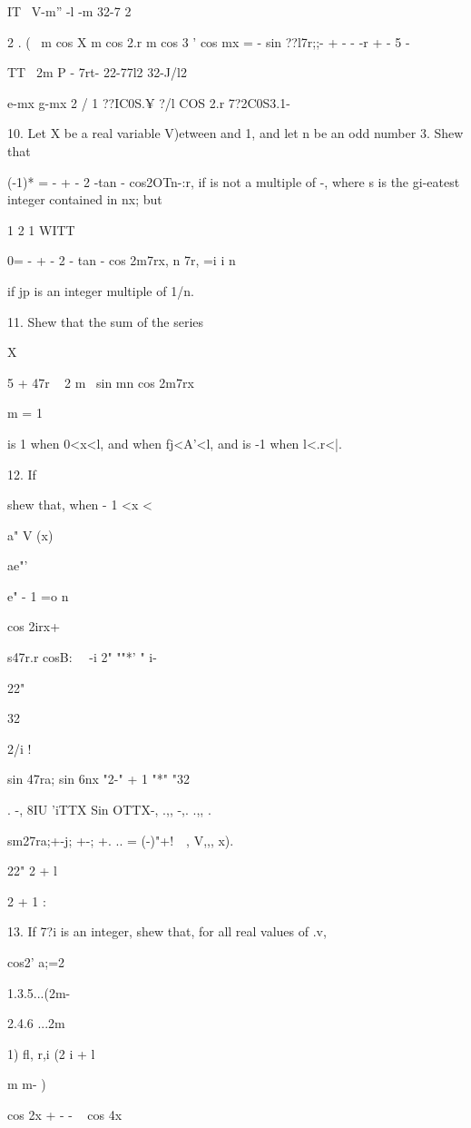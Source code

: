 {IT \ V-m'' -l -m 32-7 2

2 . ( \ m cos X m cos 2.r m cos 3 ' cos mx = - sin ??l7r;;- + - - -r
+ - 5 -

TT \ 2m P - 7rt- 22-77l2 32-J/l2

e-mx g-mx 2 / 1 ??IC0S.¥ ?/l COS 2.r 7?2C0S3.1- \

10. Let X be a real variable V)etween and 1, and let n be an odd
number 3. Shew that

(-1)* = - + - 2 -tan - cos2OTn-:r, if is not a multiple of -, where s
is the gi-eatest integer contained in nx; but

 1 2 1 WITT

0= - + - 2 - tan - cos 2m7rx, n 7r, =i i n

if jp is an integer multiple of 1/n. 

11. Shew that the sum of the series

X

 5 + 47r ~ 2 m~ sin mn cos 2m7rx

m = 1

is 1 when 0<x<l, and when fj<A'<l, and is -1 when l<.r<|.

12. If

shew that, when - 1 <x <\,

a" V (x)

ae"'

e" - 1 =o n

cos 2irx+

s47r.r cosB\pij: \ \ -i 2" ""*' " i-

22"

32

2/i !

sin 47ra; sin 6nx "2-" + 1 "*" "32

. -, 8IU 'iTTX Sin OTTX-, .,, -,. .,, .

sm27ra;+-j; +-; +. .. = (-)"+! \ \,, V,,, x).

22" 2 + l

2 + 1 :


13. If 7?i is an integer, shew that, for all real values of .v,

cos2' a;=2

1.3.5...(2m-

2.4.6 ...2m

1) fl, r,i (2 i + l

m m- )

cos 2x + - - ~ cos 4x

}

